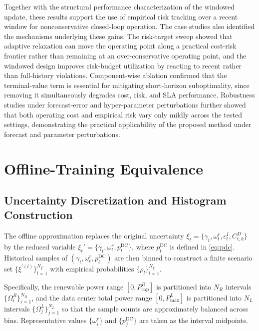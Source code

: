 \documentclass[a4paper,fleqn]{cas-dc}
\theoremstyle{plain}
\theoremstyle{remark}
\theoremstyle{plain}
\begin{document}
Together with the structural performance characterization of the windowed update, these results support the use of empirical risk tracking over a recent window for nonconservative closed-loop operation. The case studies also identified the mechanisms underlying these gains. The risk-target sweep showed that adaptive relaxation can move the operating point along a practical cost-risk frontier rather than remaining at an over-conservative operating point, and the windowed design improves risk-budget utilization by reacting to recent rather than full-history violations. Component-wise ablation confirmed that the terminal-value term is essential for mitigating short-horizon suboptimality, since removing it simultaneously degrades cost, risk, and SLA performance. Robustness studies under forecast-error and hyper-parameter perturbations further showed that both operating cost and empirical risk vary only mildly across the tested settings, demonstrating the practical applicability of the proposed method under forecast and parameter perturbations.


\FloatBarrier
\appendix
\section{Offline-Training Equivalence}\label{app:offline_training_proof}
\subsection{Uncertainty Discretization and Histogram Construction}
The offline approximation replaces the original uncertainty
$\xi_t=\{\gamma_t,\omega_t^r,c_t^I,C_{t,k}^D\}$ by the reduced variable
$\xi_t'=\{\gamma_t,\omega_t^r,p_t^{\text{DC}}\}$, where $p_t^{\text{DC}}$ is defined in \eqref{eq:pdc}. Historical
samples of $(\gamma_t,\omega_t^r,p_t^{\text{DC}})$ are then binned to construct a finite scenario set
$\{\xi^{\prime(l)}\}_{l=1}^{N_{\xi'}}$ with empirical probabilities $\{\rho_l\}_{l=1}^{N_{\xi'}}$.

Specifically, the renewable power range $[0,P_{\text{cap}}^R]$ is partitioned into $N_R$ intervals
$\{\Omega_i^R\}_{i=1}^{N_R}$, and the data center total power range $[0,P_{\max}^L]$ is partitioned into
$N_L$ intervals $\{\Omega_j^L\}_{j=1}^{N_L}$ so that the sample counts are approximately balanced across bins.
Representative values $\{\omega_i^r\}$ and $\{p_j^{\text{DC}}\}$ are taken as the interval midpoints.
\end{document}
